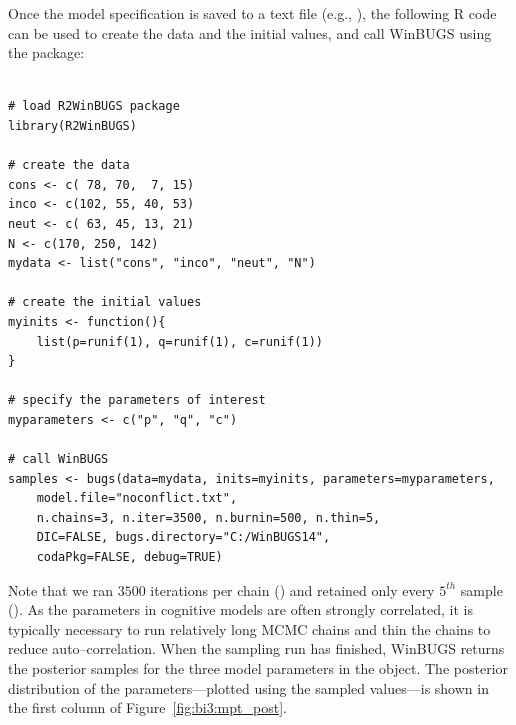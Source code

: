 Once the model specification is saved to a text file (e.g., ), the following R code can be used to create the data and the initial values, and call WinBUGS using the  package:

\begin{lstlisting}

# load R2WinBUGS package
library(R2WinBUGS)

# create the data
cons <- c( 78, 70,  7, 15)
inco <- c(102, 55, 40, 53) 
neut <- c( 63, 45, 13, 21)
N <- c(170, 250, 142)
mydata <- list("cons", "inco", "neut", "N")

# create the initial values
myinits <- function(){
    list(p=runif(1), q=runif(1), c=runif(1))
}

# specify the parameters of interest
myparameters <- c("p", "q", "c")

# call WinBUGS
samples <- bugs(data=mydata, inits=myinits, parameters=myparameters,
    model.file="noconflict.txt",
    n.chains=3, n.iter=3500, n.burnin=500, n.thin=5,
    DIC=FALSE, bugs.directory="C:/WinBUGS14",
    codaPkg=FALSE, debug=TRUE)

\end{lstlisting}

\noindent 
{Note that we ran $3500$ iterations per chain () and retained only every $5^{th}$ sample (). As the parameters in cognitive models are often strongly correlated, it is typically necessary to run relatively long MCMC chains and thin the chains to reduce auto--correlation.} When the sampling run has finished, WinBUGS returns the posterior samples for the three model parameters in the   object. The posterior distribution of the parameters---plotted using the sampled values---is shown in the first column of Figure~\ref{fig:bi3:mpt_post}.

